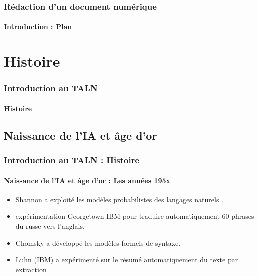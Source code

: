 \documentclass[xcolor=table]{beamer}
\begin{document}
\begin{frame}
\frametitle{Rédaction d'un document numérique}
\framesubtitle{Introduction : Plan}

\begin{multicols}{2}
\tableofcontents
\end{multicols}
\end{frame}

\section{Histoire}

\begin{frame}
\frametitle{Introduction au TALN}
\framesubtitle{Histoire}


\end{frame}

\subsection{Naissance de l'IA et âge d'or}

\begin{frame}
\frametitle{Introduction au TALN : Histoire}
\framesubtitle{Naissance de l'IA et âge d'or : Les années 195x}

\begin{itemize}
	\item {} Shannon a exploité les modèles probabilistes des langages naturels \cite{1951-shannon}.
	\item {} expérimentation Georgetown-IBM pour traduire automatiquement 60 phrases du russe vers l'anglais.
	\item {} Chomsky a développé les modèles formels de syntaxe.
	\item {} Luhn (IBM) a expérimenté sur le résumé automatiquement du texte par extraction \cite{1958-luhn}
\end{itemize}

\end{frame}
\end{document}
